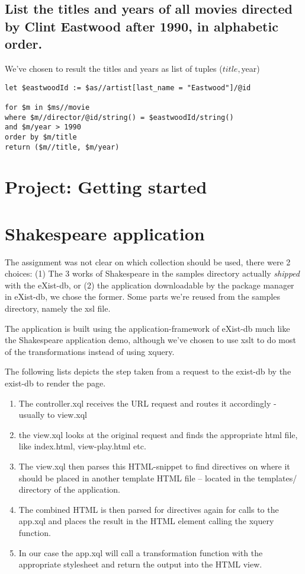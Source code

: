 \documentclass{article}
\begin{document}
\subsection{ List the titles and years of all movies directed by Clint
  Eastwood after 1990, in alphabetic order.  }

We've chosen to result the titles and years as list of tuples ($title, $year)
\begin{verbatim}
let $eastwoodId := $as//artist[last_name = "Eastwood"]/@id

for $m in $ms//movie
where $m//director/@id/string() = $eastwoodId/string()
and $m/year > 1990
order by $m/title
return ($m//title, $m/year)
\end{verbatim}

\section{Project: Getting started}
\section{Shakespeare application}
The assignment was not clear on which collection should be used, there
were 2 choices: (1) The 3 works of Shakespeare in the samples
directory actually \emph{shipped} with the eXist-db, or (2) the
application downloadable by the package manager in eXist-db, we chose
the former.  Some parts we're reused from the samples directory,
namely the xsl file.

The application is built using the application-framework of eXist-db
much like the Shakespeare application demo, although we've chosen to
use xslt to do most of the transformations instead of using xquery.

The following lists depicts the step taken from a request to the
exist-db by the exist-db to render the page.
\begin{enumerate}
\item The controller.xql receives the URL request and routes it
  accordingly - usually to view.xql
\item the view.xql looks at the original request and finds the
  appropriate html file, like index.html, view-play.html etc.
\item The view.xql then parses this HTML-snippet to find directives on
  where it should be placed in another template HTML file -- located
  in the templates/ directory of the application.
\item The combined HTML is then parsed for directives again for calls
  to the app.xql and places the result in the HTML element calling the
  xquery function.
\item In our case the app.xql will call a transformation function with
  the appropriate stylesheet and return the output into the HTML view.
\end{enumerate}
\end{document}
